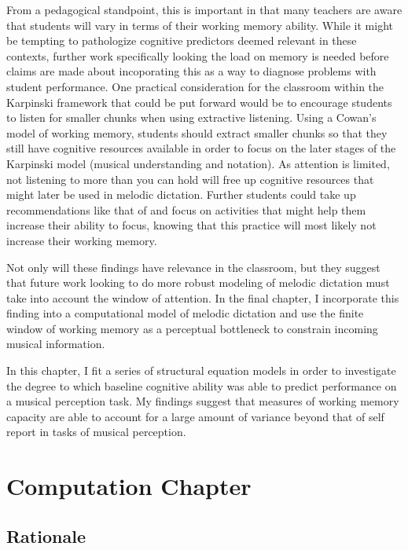 \documentclass[12pt,]{book}
\begin{document}
From a pedagogical standpoint, this is important in that many teachers are aware that students will vary in terms of their working memory ability.
While it might be tempting to pathologize cognitive predictors deemed relevant in these contexts, further work specifically looking the load on memory is needed before claims are made about incoporating this as a way to diagnose problems with student performance.
One practical consideration for the classroom within the Karpinski framework that could be put forward would be to encourage students to listen for smaller chunks when using extractive listening.
Using a Cowan's model of working memory, students should extract smaller chunks so that they still have cognitive resources available in order to focus on the later stages of the Karpinski model (musical understanding and notation).
As attention is limited, not listening to more than you can hold will free up cognitive resources that might later be used in melodic dictation.
Further students could take up recommendations like that of \citet{chenetteReframingAuralSkills2019} and focus on activities that might help them increase their ability to focus, knowing that this practice will most likely not increase their working memory.

Not only will these findings have relevance in the classroom, but they suggest that future work looking to do more robust modeling of melodic dictation must take into account the window of attention.
In the final chapter, I incorporate this finding into a computational model of melodic dictation and use the finite window of working memory as a perceptual bottleneck to constrain incoming musical information.

In this chapter, I fit a series of structural equation models in order to investigate the degree to which baseline cognitive ability was able to predict performance on a musical perception task.
My findings suggest that measures of working memory capacity are able to account for a large amount of variance beyond that of self report in tasks of musical perception.

\hypertarget{computation-chapter}{%
\chapter{Computation Chapter}\label{computation-chapter}}

\hypertarget{rationale-2}{%
\section{Rationale}\label{rationale-2}}
\end{document}
